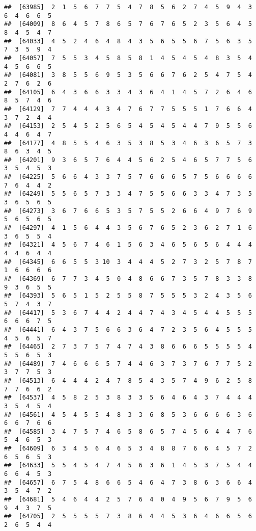 \documentclass[
]{book}
\begin{document}
\begin{verbatim}
##  [63985]  2  1  5  6  7  7  5  4  7  8  5  6  2  7  4  5  9  4  3  6  4  6  6  5
##  [64009]  8  6  4  5  7  8  6  5  7  6  7  6  5  2  3  5  6  4  5  8  4  5  4  7
##  [64033]  4  5  2  4  6  4  8  4  3  5  6  5  5  6  7  5  6  3  5  7  3  5  9  4
##  [64057]  7  5  5  3  4  5  8  5  8  1  4  5  4  5  4  8  3  5  4  4  5  6  6  5
##  [64081]  3  8  5  5  6  9  5  3  5  6  6  7  6  2  5  4  7  5  4  2  7  6  2  6
##  [64105]  6  4  3  6  6  3  3  4  3  6  4  1  4  5  7  2  6  4  6  8  5  7  4  6
##  [64129]  7  7  4  4  4  3  4  7  6  7  7  5  5  5  1  7  6  6  4  3  7  2  4  4
##  [64153]  2  5  4  5  2  5  6  5  4  5  4  5  4  4  7  9  5  5  6  4  4  6  4  7
##  [64177]  4  8  5  5  4  6  3  5  3  8  5  3  4  6  3  6  5  7  3  8  6  3  4  5
##  [64201]  9  3  6  5  7  6  4  4  5  6  2  5  4  6  5  7  7  5  6  3  5  4  5  3
##  [64225]  5  6  6  4  3  3  7  5  7  6  6  6  5  7  5  6  6  6  6  7  6  4  4  2
##  [64249]  5  5  6  5  7  3  3  4  7  5  5  6  6  3  3  4  7  3  5  3  6  5  6  5
##  [64273]  3  6  7  6  6  5  3  5  7  5  5  2  6  6  4  9  7  6  9  5  6  5  6  5
##  [64297]  4  1  5  6  4  4  3  5  6  7  6  5  2  3  6  2  7  1  6  3  6  5  5  4
##  [64321]  4  5  6  7  4  6  1  5  6  3  4  6  5  6  5  6  4  4  4  4  4  6  4  4
##  [64345]  6  6  5  5  3 10  3  4  4  4  5  2  7  3  2  5  7  8  7  1  6  6  6  6
##  [64369]  6  7  7  3  4  5  0  4  8  6  6  7  3  5  7  8  3  3  8  9  3  6  5  5
##  [64393]  5  6  5  1  5  2  5  5  8  7  5  5  5  3  2  4  3  5  6  5  7  4  3  7
##  [64417]  5  3  6  7  4  4  2  4  4  7  4  3  4  5  4  4  5  5  5  6  6  6  7  5
##  [64441]  6  4  3  7  5  6  6  3  6  4  7  2  3  5  6  4  5  5  5  4  5  6  5  7
##  [64465]  2  7  3  7  5  7  4  7  4  3  8  6  6  6  5  5  5  5  4  5  5  6  5  3
##  [64489]  7  4  6  6  6  5  7  4  4  6  3  7  3  7  6  7  7  5  2  3  7  7  5  3
##  [64513]  6  4  4  4  2  4  7  8  5  4  3  5  7  4  9  6  2  5  8  7  7  6  6  2
##  [64537]  4  5  8  2  5  3  8  3  3  5  6  4  6  4  3  7  4  4  4  3  5  4  5  4
##  [64561]  4  5  4  5  5  4  8  3  3  6  8  5  3  6  6  6  6  3  6  6  6  7  6  6
##  [64585]  3  4  7  5  7  4  6  5  8  6  5  7  4  5  6  4  4  7  6  5  4  6  5  3
##  [64609]  6  3  4  5  6  4  6  5  3  4  8  8  7  6  6  4  5  7  2  6  5  6  5  3
##  [64633]  5  5  4  5  4  7  4  5  6  3  6  1  4  5  3  7  5  4  4  6  6  4  5  3
##  [64657]  6  7  5  4  8  6  6  5  4  6  4  7  3  8  6  3  6  6  4  3  5  4  7  2
##  [64681]  5  4  6  4  4  2  5  7  6  4  0  4  9  5  6  7  9  5  6  9  4  3  7  5
##  [64705]  2  5  5  5  5  7  3  8  6  4  4  5  3  6  4  6  6  5  6  2  6  5  4  4

\end{verbatim}
\end{document}
